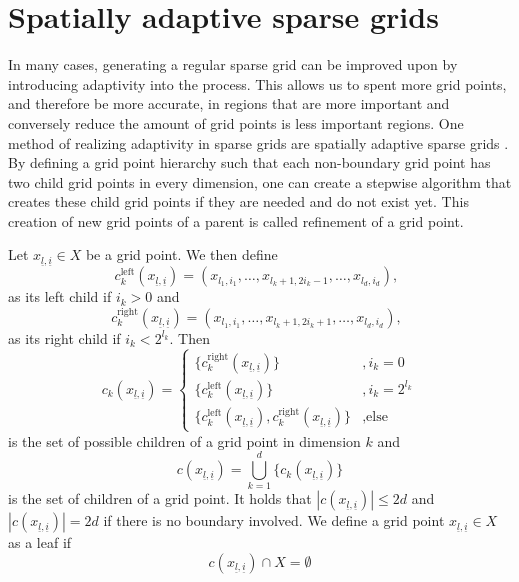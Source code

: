 \documentclass[
  a4paper,  %
  twoside,  %
  bibliography=totoc,
  headsepline,
  cleardoublepage=empty,
  parskip=half,
  draft=false
]{scrbook}
\begin{document}

\section{Spatially adaptive sparse grids}

In many cases, generating a regular sparse grid can be improved upon by introducing adaptivity into the process.
This allows us to spent more grid points, and therefore be more accurate, in regions that are more important and conversely reduce the amount of grid points is less important regions.
One method of realizing adaptivity in sparse grids are spatially adaptive sparse grids \cite{}.
By defining a grid point hierarchy such that each non-boundary grid point has two child grid points in every dimension, one can create a stepwise algorithm that creates these child grid points if they are needed and do not exist yet.
This creation of new grid points of a parent is called refinement of a grid point.

\begin{definition}
Let $x_{\underline{l},\underline{i}} \in X$ be a grid point.
We then define
\begin{equation}
c_{k}^{\text{left}}(x_{\underline{l},\underline{i}})=(x_{l_1,i_1}, \dots, x_{l_k + 1,2  i_k - 1}, \dots, x_{l_d,i_d}), ~~ 
\end{equation}
as its left child if $i_k > 0$ and
\begin{equation}
c_{k}^{\text{right}}(x_{\underline{l},\underline{i}})=(x_{l_1,i_1}, \dots, x_{l_k + 1,2  i_k + 1}, \dots, x_{l_d,i_d}), ~~ 
\end{equation}
as its right child if $i_k < 2^{l_k}$.
Then
\begin{equation}
c_{k}(x_{\underline{l},\underline{i}})=
\begin{cases}
\{c_{k}^{\text{right}}(x_{\underline{l},\underline{i}})\}&, i_k=0\\
\{c_{k}^{\text{left}}(x_{\underline{l},\underline{i}})\}&,i_k= 2^{l_k}\\
\{c_{k}^{\text{left}}(x_{\underline{l},\underline{i}}),c_{k}^{\text{right}}(x_{\underline{l},\underline{i}}) \}&, \text{else}
\end{cases}
\end{equation}
is the set of possible children of a grid point in dimension $k$ and 
\begin{equation}
c(x_{\underline{l},\underline{i}})= \bigcup_{k=1}^d \{c_{k}(x_{\underline{l},\underline{i}})\}
\end{equation}
is the set of children of a grid point. It holds that $|c(x_{\underline{l},\underline{i}})| \leq 2d$ and $|c(x_{\underline{l},\underline{i}})| =2d$ if there is no boundary involved.
We define a grid point $x_{\underline{l},\underline{i}} \in X$ as a leaf if
\begin{equation}
c(x_{\underline{l},\underline{i}}) \cap X = \emptyset
\end{equation}
\end{definition}
\end{document}
